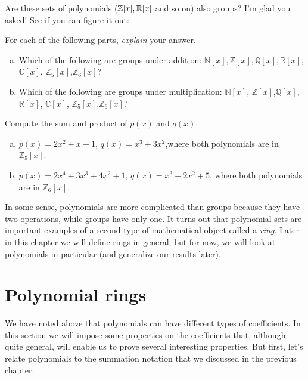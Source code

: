 Are these sets of polynomials ($\mathbb{Z}[x], \mathbb{R}[x]$ and so on) also groups? I'm glad you asked! See if you can figure it out:

\begin{exercise}\label{exercise:poly:poly2}
For each of the following parts, \emph{explain} your answer. 
\begin{enumerate}[(a)]
\item
Which of the following are groups under addition: $\mathbb{N}[x], \mathbb{Z}[x], \mathbb{Q}[x], \mathbb{R}[x]$, $\mathbb{C}[x]$, $\mathbb{Z}_5[x]$,$\mathbb{Z}_6[x]$? 
\item
Which of the following are groups under multiplication: $\mathbb{N}[x]$, $\mathbb{Z}[x]$,$\mathbb{Q}[x]$,$\mathbb{R}[x]$, $\mathbb{C}[x]$, $\mathbb{Z}_5[x]$,$\mathbb{Z}_6[x]$? 

\end{enumerate}
\end{exercise}

\begin{exercise}\label{exercise:poly:poly3}
Compute the sum and product of $p(x)$ and $q(x)$.
\begin{enumerate}[(a)]
\item
$p(x)= 2x^2 + x + 1$, $q(x)=x^3 +3x^2$,where both polynomials are in $\mathbb{Z}_5[x]$.
\item
$p(x)= 2x^4 + 3x^3 + 4x^2+1$, $q(x)=x^3 +2x^2+5$, where both polynomials are in $\mathbb{Z}_6[x]$.
\end{enumerate}
\end{exercise}

In some sense, polynomials are more complicated than groups because they have two operations, while groups have only one. It turns out that polynomial sets are important examples of a second type of mathematical object called a \emph{ring}. Later in this chapter we will define rings in general; but for now, we will look at polynomials in particular (and generalize our results later).

\section {Polynomial rings}
 We have noted above that polynomials can have different types of coefficients. 
In this section we will  impose some properties on the coefficients that, although quite general, will enable us to prove several interesting properties. But first, let's relate polynomials to the summation notation that we discussed in the previous chapter:

